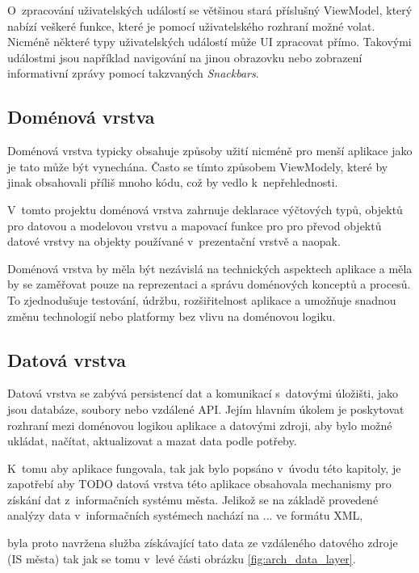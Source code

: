 O~zpracování uživatelských událostí se většinou stará příslušný ViewModel, který nabízí veškeré funkce, které je pomocí uživatelského rozhraní možné volat.
Nicméně některé typy uživatelských událostí může UI zpracovat přímo. Takovými událostmi jsou například navigování na jinou obrazovku nebo zobrazení 
informativní zprávy pomocí takzvaných \textit{Snackbars}.

\subsection*{Doménová vrstva}
Doménová vrstva typicky obsahuje způsoby užití nicméně pro menší aplikace jako je tato může být vynechána. Často se tímto způsobem  ViewModely,
které by jinak obsahovali příliš mnoho kódu, což by vedlo k~nepřehlednosti.

V~tomto projektu doménová vrstva zahrnuje deklarace výčtových typů, objektů pro datovou a modelovou vrstvu a mapovací funkce pro pro převod
objektů datové vrstvy na objekty používané v~prezentační vrstvě a naopak.

Doménová vrstva by měla být nezávislá na technických aspektech aplikace a měla by se zaměřovat pouze na reprezentaci a správu doménových
 konceptů a procesů. To zjednodušuje testování, údržbu, rozšiřitelnost aplikace a umožňuje snadnou změnu technologií nebo platformy bez 
 vlivu na doménovou logiku.

\subsection*{Datová vrstva}


Datová vrstva se zabývá persistencí dat a komunikací s~datovými úložišti, jako jsou
databáze, soubory nebo vzdálené API. Jejím hlavním úkolem je poskytovat rozhraní mezi doménovou logikou aplikace a datovými zdroji, 
aby bylo možné ukládat, načítat, aktualizovat a mazat data podle potřeby.

K~tomu aby aplikace fungovala, tak jak bylo popsáno v~úvodu této kapitoly, je zapotřebí aby  TODO datová vrstva této aplikace obsahovala mechanismy pro
 získání dat z~informačních systému města. Jelikož se na základě provedené analýzy data v~informačních systémech nachází na ... ve formátu XML, 


 byla proto navržena služba získávající tato data ze vzdáleného datového zdroje (IS města) tak jak se tomu v~levé části obrázku \ref{fig:arch_data_layer}. 


